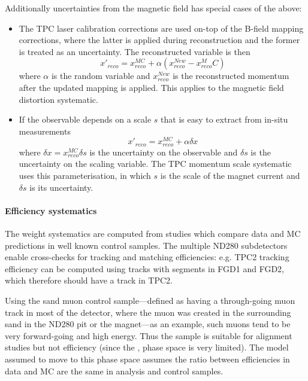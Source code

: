 Additionally uncertainties from the magnetic field has special cases of the above:
\begin{itemize}
	\item The TPC laser calibration corrections are used on-top of the B-field mapping corrections, where the latter is applied during reconstruction and the former is treated as an uncertainty. The reconstructed variable is then
	\begin{equation}
		x'_{reco} = x^{MC}_{reco} + \alpha \left(x_{reco}^{New}-x_{reco}^MC\right)
	\end{equation}
	where $\alpha$ is the random variable and $x_{reco}^{New}$ is the reconstructed momentum after the updated mapping is applied. This applies to the magnetic field distortion systematic.
	\item If the observable depends on a scale $s$ that is easy to extract from in-situ measurements
	\begin{equation}
		x'_{reco} = x_{reco}^{MC}+\alpha \delta x
	\end{equation}
	where $\delta x = x_{reco}^{MC} \delta s$ is the uncertainty on the observable and $\delta s$ is the uncertainty on the scaling variable. The TPC momentum scale systematic uses this parameterisation, in which $s$ is the scale of the magnet current and $\delta s$ is its uncertainty.
\end{itemize}

\paragraph{Efficiency systematics}
The weight systematics are computed from studies which compare data and MC predictions in well known control samples. The multiple ND280 subdetectors enable cross-checks for tracking and matching efficiencies: e.g. TPC2 tracking efficiency can be computed using tracks with segments in FGD1 and FGD2, which therefore should have a track in TPC2.

Using the sand muon control sample---defined as having a through-going muon track in most of the detector, where the muon was created in the surrounding sand in the ND280 pit or the magnet---as an example, such muons tend to be very forward-going and high energy. Thus the sample is suitable for alignment studies but not efficiency (since the \pmu, \cosmu phase space is very limited). The model assumed to move to this phase space assumes the ratio between efficiencies in data and MC are the same in analysis and control samples.

